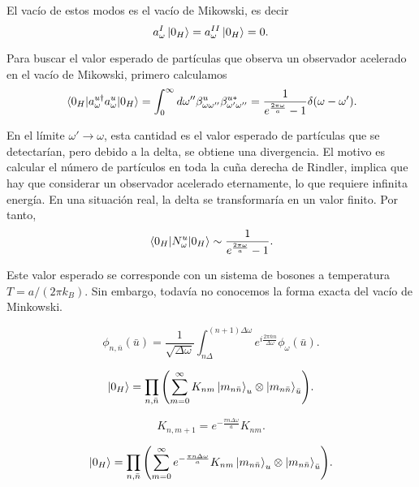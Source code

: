 El vacío de estos modos es el vacío de Mikowski, es decir
\begin{equation}
  a_\omega^I \ket{0_H} = a_\omega^{II}\ket{0_H} = 0.
\end{equation}
 
Para buscar el valor esperado de partículas que observa un observador acelerado
en el vacío de Mikowski, primero calculamos
\begin{equation}
  \ev{a_\omega^{u\dagger}a_\omega^u}{0_H} = \int_0^\infty d\omega'' \beta_{\omega\omega''}^u
  \beta_{\omega'\omega''}^{u*} = \frac{1}{e^{\frac{2\pi\omega}{a}}-1}\delta(\omega-\omega').
\end{equation}

En el límite $\omega'\to\omega$, esta cantidad es el valor esperado de partículas que se
detectarían, pero debido a la delta, se obtiene una divergencia.
El motivo es calcular el número de partículos en toda la cuña derecha de Rindler, 
implica que hay que considerar un observador acelerado eternamente, lo que requiere infinita
energía.
En una situación real, la delta se transformaría en un valor finito.
Por tanto,
\begin{equation}
  \ev{N_\omega^u}{0_H} \sim \frac{1}{e^{\frac{2\pi\omega}{a}}-1}.
\end{equation}

Este valor esperado se corresponde con un sistema de bosones a temperatura $T=a/(2\pi k_B)$.
Sin embargo, todavía no conocemos la forma exacta del vacío de Minkowski.



\begin{equation}
  \phi_{n,\bar n}(\bar u)=\frac{1}{\sqrt{\Delta \omega}}\int_{n\Delta}^{(n+1)\Delta \omega} e^{i\frac{2\pi \bar n n}{\Delta \omega}}
  \phi_\omega(\bar u).
\end{equation}


\begin{equation}
  \ket{0_H} = \prod_{n,\bar n} \qty(\sum_{m=0}^\infty K_{nm} \ket{m_{n\bar n}}_u\otimes \ket{m_{n\bar n}}_{\bar u}).
\end{equation}

\begin{equation}
  K_{n,m+1}=e^{-\frac{\pi n\Delta \omega }{a}}K_{nm}.
\end{equation}

\begin{equation}
  \ket{0_H} = \prod_{n,\bar n} \qty(\sum_{m=0}^\infty e^{-\frac{\pi n\Delta \omega }{a}}K_{nm}\ket{m_{n\bar n}}_u\otimes \ket{m_{n\bar n}}_{\bar u}).
\end{equation}

